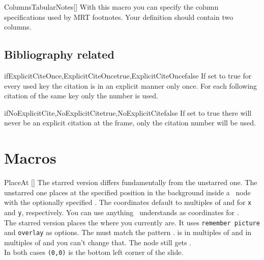 \begin{describemacro}{ColumnsTabularNotes}[]
  With this macro you can specify the column specifications used by MRT
  footnotes. Your definition should contain two columns.
\end{describemacro}

\subsection{Bibliography related}
\begin{describemacro}
  {ifExplicitCiteOnce,ExplicitCiteOncetrue,ExplicitCiteOncefalse}%
  If set to true for every used key the citation is in an explicit manner only
  once. For each following citation of the same key only the number is used.
\end{describemacro}

\begin{describemacro}{ifNoExplicitCite,NoExplicitCitetrue,NoExplicitCitefalse}
  If set to true there will never be an explicit citation at the frame, only the
  citation number will be used.
\end{describemacro}

\section{Macros}\label{sec:beam:macros}
\begin{describemacro}{PlaceAt}%
  [\meta{*}]
  The starred version differs fundamentally from the unstarred one. The
  unstarred one places  at the specified position  in
  the background inside a \TikZ\ node with the optionally specified . The coordinates default to multiples of  and
   for \texttt{x} and \texttt{y}, respectively. You can use
  anything \TikZ\ understands as coordinates for .\\[\parskip]
  The starred version places the  where you currently are. It
  uses \texttt{remember picture} and \texttt{overlay} as options. The 
  must match the pattern .  is in multiples of 
  and  in multiples of  and you can't change that. The
  node still gets .\\[\parskip]
  In both cases \texttt{(0,0)} is the bottom left corner of the slide.
\end{describemacro}

